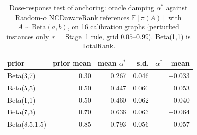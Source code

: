 \begin{table}[t]
\centering
\small
\caption{Dose-response test of anchoring: oracle damping $\alpha^*$ against Random-$\alpha$ NCDawareRank references $\mathbb{E}[\pi(A)]$ with $A\sim\mathrm{Beta}(a,b)$, on 16 calibration graphs (perturbed instances only, $r$ = Stage~1 rule, grid $0.05$--$0.99$). Beta(1,1) is TotalRank.}
\label{tab:rapr}
\begin{tabular}{@{}lrrrr@{}}
\toprule
prior & prior mean & mean $\alpha^*$ & s.d. & $\alpha^*-$mean \\
\midrule
Beta(3,7) & 0.30 & 0.267 & 0.046 & $-$0.033 \\
Beta(5,5) & 0.50 & 0.447 & 0.060 & $-$0.053 \\
Beta(1,1) & 0.50 & 0.460 & 0.062 & $-$0.040 \\
Beta(7,3) & 0.70 & 0.636 & 0.063 & $-$0.064 \\
Beta(8.5,1.5) & 0.85 & 0.793 & 0.056 & $-$0.057 \\
\bottomrule
\end{tabular}
\end{table}
